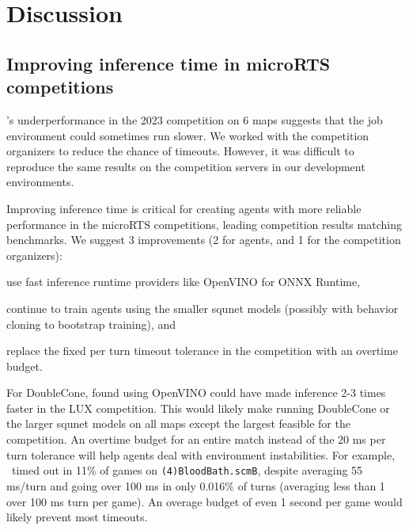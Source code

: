 \documentclass{article}
\begin{document}
\section{Discussion}
\subsection{Improving inference time in microRTS competitions}
\agentName's underperformance in the 2023 competition on 6 maps suggests that the job
environment could sometimes run slower. We worked with the competition
organizers to reduce the chance of timeouts. However, it was difficult to reproduce the same results on
the competition servers in our development environments.

Improving inference time is critical for creating agents with more reliable performance
in the microRTS competitions, leading competition results matching benchmarks. 
We suggest 3 improvements (2 for agents, and 1 for the competition organizers):
\begin{inparaenum}[(1)]
    \item use fast inference runtime providers like OpenVINO for ONNX Runtime,
    \item continue to train agents using the smaller squnet models (possibly with
    behavior cloning to bootstrap training), and
    \item replace the fixed per turn timeout tolerance in the competition with an overtime
    budget.
\end{inparaenum}
For DoubleCone, \citet{Ferdinand2021doublecone} found using OpenVINO could have made
inference 2-3 times faster in the LUX competition. This  would likely
make running DoubleCone or the larger squnet models on all maps except the largest
feasible for the competition. An overtime budget for an entire match instead of the 20 ms
per turn tolerance will help agents deal with environment instabilities. For example,
\bcPPOAgent\ timed out in 11\% of games on \texttt{(4)BloodBath.scmB}, despite averaging
55 ms/turn and going over 100 ms in only 0.016\% of turns (averaging less than 1 over
100 ms turn per game). An overage budget of even 1 second per game would likely prevent
most timeouts.
\end{document}
